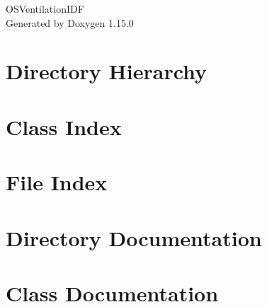 \documentclass[twoside]{book}
\newcommand{\+}{\discretionary{\mbox{\scriptsize$\hookleftarrow$}}{}{}}
\newcommand{\clearemptydoublepage}{%
    \newpage{\pagestyle{empty}\cleardoublepage}%
  }
\begin{document}
  \raggedbottom
    \hypersetup{pageanchor=false,
                bookmarksnumbered=true,
                pdfencoding=unicode
               }
  \begin{titlepage}
  \vspace*{7cm}
  \begin{center}%
  {\Large OSVentilation\+IDF}\\
  \vspace*{1cm}
  {\large Generated by Doxygen 1.15.0}\\
  \end{center}
  \end{titlepage}
  \clearemptydoublepage
  \tableofcontents
  \clearemptydoublepage
  \hypersetup{pageanchor=true}
\chapter{Directory Hierarchy}

\chapter{Class Index}

\chapter{File Index}

\chapter{Directory Documentation}



\chapter{Class Documentation}


























\end{document}
